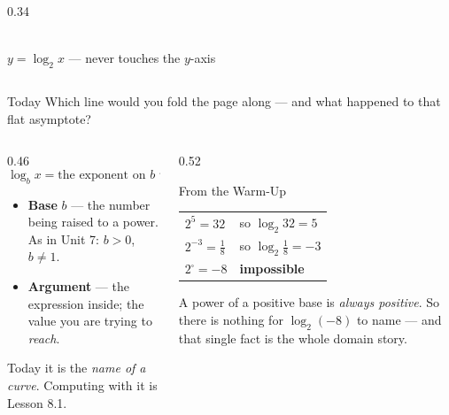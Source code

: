 \documentclass[aspectratio=169, 11pt]{beamer}
\newcommand{\logcurve}[5]{\draw[very thick, forest, domain=#4:#5, samples=120, smooth]
  plot ({pow(#1,\x-(#3))+(#2)},{\x});}
\begin{document}
\begin{frame}[t, plain]
\begin{columns}[T]
\begin{column}{0.34\textwidth}
\\[2pt]
      {\footnotesize $y=\log_2 x$ --- never touches the $y$-axis}
    \end{column}
  \end{columns}
  \begin{block}{Today}
    Which line would you fold the page along --- and what happened to that flat asymptote?
  \end{block}
\end{frame}

\begin{frame}[t, plain]
  \begin{columns}[T]
    \begin{column}{0.46\textwidth}
      \[ \log_b x = \text{the exponent on } b \text{ that gives } x \]
      \begin{itemize}\setlength{\itemsep}{4pt}
        \item \textbf{Base} $b$ --- the number being raised to a power. As in Unit 7: $b>0$, $b\ne1$.
        \item \textbf{Argument} --- the expression inside; the value you are trying to \emph{reach}.
      \end{itemize}
      \vspace{2pt}
      {\footnotesize Today it is the \emph{name of a curve}. Computing with it is Lesson 8.1.}
    \end{column}
    \begin{column}{0.52\textwidth}
      \begin{block}{From the Warm-Up}
        \centering
        \begin{tabular}{ll}
        $2^5=32$ & so $\log_2 32 = 5$ \\[3pt]
        $2^{-3}=\tfrac18$ & so $\log_2 \tfrac18 = -3$ \\[3pt]
        $2^{\square}=-8$ & \textbf{impossible} \\
        \end{tabular}
      \end{block}
      \vspace{3pt}
      {\footnotesize A power of a positive base is \emph{always positive}. So there is nothing for
      $\log_2(-8)$ to name --- and that single fact is the whole domain story.}
    \end{column}
  \end{columns}
\end{frame}
\end{document}

